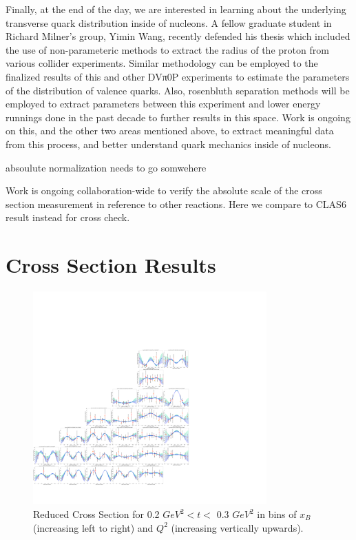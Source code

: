 Finally, at the end of the day, we are interested in learning about the underlying transverse quark distribution inside of
nucleons. A fellow graduate student in Richard Milner’s group, Yimin Wang, recently defended his thesis which included the
use of non-parameteric methods to extract the radius of the proton from various collider experiments. Similar methodology
can be employed to the finalized results of this and other DVπ0P experiments to estimate the parameters of the distribution
of valence quarks. Also, rosenbluth separation methods will be employed to extract parameters between this experiment and
lower energy runnings done in the past decade to further results in this space. Work is ongoing on this, and the other two areas
mentioned above, to extract meaningful data from this process, and better understand quark mechanics inside of nucleons.

absoulute normalization needs to go somwehere

Work is ongoing collaboration-wide to verify the absolute scale of the cross section measurement in reference to other reactions. Here we compare to CLAS6 result instead for cross check. 


\section{Cross Section Results}\label{sec:Ch5_raw_results}





    \begin{figure}[ht]
        \centering
        \includegraphics[trim={14.6cm 4cm 27.2cm 4cm},clip,width=0.8\textwidth]{Chapters/Ch5-Further/c12xsec/combined_t0.2.png}
        \caption[Reduced Cross Section for 0.2 $GeV^2 < t <$ 0.3 $ GeV^2$]{Reduced Cross Section for 0.2 $ GeV^2 < t <$ 0.3 $GeV^2$ in bins of $x_B$ (increasing left to right) and $Q^2$ (increasing vertically upwards). }
        \label{fig:combined_t0.2}
    \end{figure}

